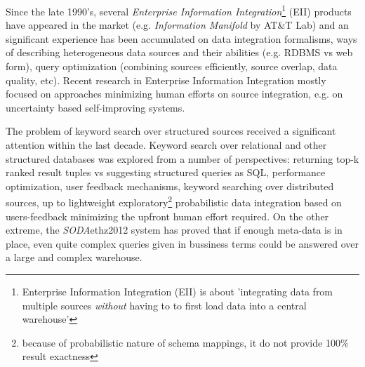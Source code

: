 


Since the late 1990's, several \textit{Enterprise Information Integration}\footnote{%
	Enterprise Information Integration (EII) is about 'integrating data from 
	multiple sources 	\textit{without} having to to first load data into
	 a central warehouse'\cite[p.1]{eii_2005}}
 (EII) products have appeared in the market (e.g. \textit{Information Manifold} by AT\&T Lab) and an significant experience has been accumulated on data integration formalisms, ways of describing heterogeneous data sources and their abilities (e.g. RDBMS vs web form), query optimization (combining sources efficiently, source overlap, data quality, etc)\cite{eii_2005}. 
%
Recent research in  Enterprise Information Integration mostly focused on approaches minimizing  human efforts on source integration, e.g. on uncertainty based self-improving systems\cite[ch.19]{principles_data_integration}.

The problem of keyword search over structured sources received a significant attention within the last decade. Keyword search over relational and other structured databases was explored from a number of perspectives: returning top-k ranked result tuples vs suggesting structured queries as SQL, performance optimization, user feedback mechanisms, keyword searching over distributed sources, up to lightweight exploratory\footnote{because of probabilistic nature of schema mappings, it do not provide 100\% result exactness} probabilistic data integration based on users-feedback minimizing the upfront human effort required\cite[ch.16]{principles_data_integration}. 
%
%
On the other extreme, the \textit{SODA}{ethz2012} system has proved that if enough meta-data is in place, even quite complex queries given in bussiness terms could be answered over a large and complex warehouse.

